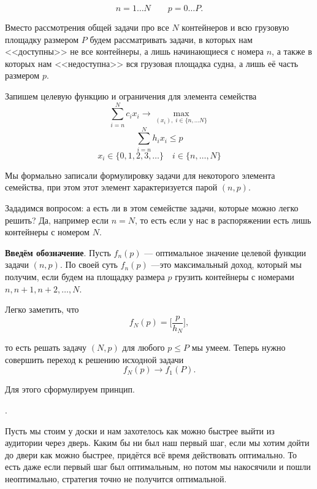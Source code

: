 \[
	n = 1 \dots N \qquad p = 0 \dots P.
\]

Вместо рассмотрения общей задачи про все $N$ контейнеров и всю грузовую площадку размером $P$ будем рассматривать задачи, в которых нам <<доступны>> не все контейнеры, а лишь начинающиеся с номера $n$, а также в которых нам <<недоступна>> вся грузовая площадка судна, а лишь её часть размером $p$.

Запишем целевую функцию и ограничения для элемента семейства
\[
	\sum_{i=n}^{N} c_i x_i \to \max_{(x_i), \; i \in \{n, \dots N\}}
\]
\[
	\sum_{i=n}^{N} h_i x_i \le p
\]
\[
	x_i \in \{0, 1, 2, 3, \dots\} \quad i \in \{n, \dots, N\}
\]

Мы формально записали формулировку задачи для некоторого элемента семейства, при этом этот элемент характеризуется парой $(n, p)$.

Зададимся вопросом: а есть ли в этом семействе задачи, которые можно легко решить? Да, например если $n = N$, то есть если у нас в распоряжении есть лишь контейнеры с номером $N$.

\textbf{Введём обозначение}. Пусть $\boxed{f_n(p)}$ --- оптимальное значение целевой функции задачи $(n, p)$. По своей суть $f_n(p)$ ---это максимальный доход, который мы получим, если будем на площадку размера $p$ грузить контейнеры с номерами $n, n+1, n+2, \dots, N$.

Легко заметить, что
\[
	f_N(p) = \bigg[\frac{p}{h_N}\bigg],
\]

то есть решать задачу $(N, p)$ для любого $p \le P$ мы умеем. Теперь нужно совершить переход к решению исходной задачи
\[
	f_N(p) \longrightarrow f_1(P).
\]

Для этого сформулируем принцип.


.

\example

Пусть мы стоим у доски и нам захотелось как можно быстрее выйти из аудитории через дверь. Каким бы ни был наш первый шаг, если мы хотим дойти до двери как можно быстрее, придётся всё время действовать оптимально. То есть даже если первый шаг был оптимальным, но потом мы накосячили и пошли неоптимально, стратегия точно не получится оптимальной.

\bigskip

